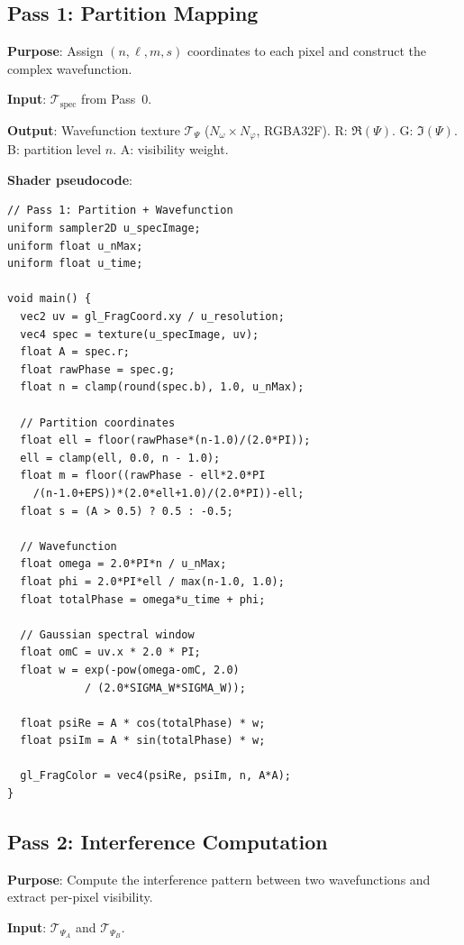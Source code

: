 \documentclass[11pt,twocolumn,a4paper]{article}
\begin{document}
\subsection{Pass 1: Partition Mapping}
\label{subsec:pass1}

\textbf{Purpose}: Assign $(n, \ell, m, s)$ coordinates to each pixel
and construct the complex wavefunction.

\textbf{Input}: $\mathcal{T}_{\text{spec}}$ from Pass~0.

\textbf{Output}: Wavefunction texture $\mathcal{T}_{\Psi}$
($N_\omega \times N_\varphi$, RGBA32F).
R: $\Re(\Psi)$. G: $\Im(\Psi)$. B: partition level $n$. A: visibility
weight.

\textbf{Shader pseudocode}:
\begin{lstlisting}[style=glsl]
// Pass 1: Partition + Wavefunction
uniform sampler2D u_specImage;
uniform float u_nMax;
uniform float u_time;

void main() {
  vec2 uv = gl_FragCoord.xy / u_resolution;
  vec4 spec = texture(u_specImage, uv);
  float A = spec.r;
  float rawPhase = spec.g;
  float n = clamp(round(spec.b), 1.0, u_nMax);

  // Partition coordinates
  float ell = floor(rawPhase*(n-1.0)/(2.0*PI));
  ell = clamp(ell, 0.0, n - 1.0);
  float m = floor((rawPhase - ell*2.0*PI
    /(n-1.0+EPS))*(2.0*ell+1.0)/(2.0*PI))-ell;
  float s = (A > 0.5) ? 0.5 : -0.5;

  // Wavefunction
  float omega = 2.0*PI*n / u_nMax;
  float phi = 2.0*PI*ell / max(n-1.0, 1.0);
  float totalPhase = omega*u_time + phi;

  // Gaussian spectral window
  float omC = uv.x * 2.0 * PI;
  float w = exp(-pow(omega-omC, 2.0)
            / (2.0*SIGMA_W*SIGMA_W));

  float psiRe = A * cos(totalPhase) * w;
  float psiIm = A * sin(totalPhase) * w;

  gl_FragColor = vec4(psiRe, psiIm, n, A*A);
}
\end{lstlisting}

\subsection{Pass 2: Interference Computation}
\label{subsec:pass2}

\textbf{Purpose}: Compute the interference pattern between two
wavefunctions and extract per-pixel visibility.

\textbf{Input}: $\mathcal{T}_{\Psi_A}$ and $\mathcal{T}_{\Psi_B}$.
\end{document}
